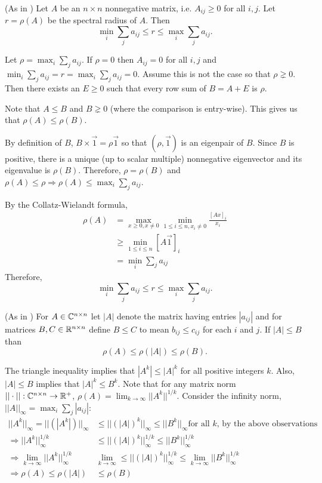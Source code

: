 \documentclass{article}
\begin{document}
\begin{claim}\label{sum_bound} (As in \cite{Meyer:2001fk})
Let $A$ be an $n\times n$ nonnegative matrix, i.e. $A_{ij}\geq 0$ for all $i,j$.  Let $r=\rho(A)$ be the spectral radius of $A$.  Then
$$\min_i\sum_ja_{ij}\leq r\leq \max_i\sum_ja_{ij}.$$
\end{claim}

\begin{pf}
 Let $\rho=\max_i\sum_ja_{ij}$.  If $\rho=0$ then $A_{ij}=0$ for all $i,j$ and $\min_i\sum_ja_{ij}=r=\max_i\sum_ja_{ij}=0$.  Assume this is not the case so that $\rho\gneq0$. Then there exists an $E\geq 0$ such that every row sum of $B=A+E$ is $\rho$.  
 
 Note that $A\leq B$ and $B\gneq 0$ (where the comparison is entry-wise).   This gives us that $\rho(A)\leq \rho(B)$. 
 
 By definition of $B$, $B\times\vec{1}=\rho\vec{1}$ so that $(\rho,\vec{1})$ is an eigenpair of $B$.  Since $B$ is positive, there is a unique (up to scalar multiple) nonnegative eigenvector and its eigenvalue is $\rho(B)$.  Therefore, $\rho=\rho(B)$ and $\rho(A)\leq \rho \Rightarrow \rho(A)\leq\max_i\sum_ja_{ij}$. 
 
 By the Collatz-Wielandt formula,
 \begin{align*}
 \rho(A)&=\max_{x\geq 0,x\neq 0}\min_{1\leq i\leq n,x_i\neq 0}\frac{[Ax]_i}{x_i}
 \\ &\geq \min_{1\leq i\leq n}[A\vec{1}]_i
 \\ &=\min_i\sum_ja_{ij}
 \end{align*}
 Therefore, $$\min_i\sum_ja_{ij}\leq r\leq \max_i\sum_ja_{ij}.$$
\end{pf}

\begin{lemma} (As in \cite{Meyer:2001fk})
For $A\in{\mathbb{C}}^{n\times n}$ let $|A|$ denote the matrix having entries $|a_{ij}|$ and for matrices $B,C\in{\mathbb{R}}^{n\times n}$ define $B\leq C$ to mean $b_{ij}\leq c_{ij}$ for each $i$ and $j$.  If $|A|\leq B$ than 
$$\rho(A)\leq \rho(|A|)\leq\rho(B).$$
\end{lemma}

\begin{pf}
The triangle inequality implies that $|A^k|\leq |A|^k$ for all positive integers $k$.  Also, $|A|\leq B$ implies that $|A|^k\leq B^k$.  Note that for any matrix norm $||\cdot||:{\mathbb{C}}^{n\times n}\to{\mathbb{R}}^+$, $\rho(A)=\lim_{k\to\infty}||A^k||^{1/k}.$  Consider the infinity norm, $||A||_\infty=\max_i\sum_j|a_{ij}|$:
\begin{align*}
||A^k||_\infty=|| (|A^k|) ||_\infty&\leq ||(|A|)^k||_\infty\leq ||B^k||_\infty \text{for all $k$, by the above observations}
\\ \Rightarrow ||A^k||_\infty^{1/k}&\leq ||(|A|)^k||_\infty^{1/k}\leq ||B^k||_\infty^{1/k}
\\ \Rightarrow\lim_{k\to\infty} ||A^k||_\infty^{1/k}&\lim_{k\to\infty}\leq ||(|A|)^k||_\infty^{1/k}\leq \lim_{k\to\infty}||B^k||_\infty^{1/k}
\\ \Rightarrow \rho(A)\leq \rho(|A|)&\leq\rho(B)
\end{align*}
\end{pf}
\end{document}
